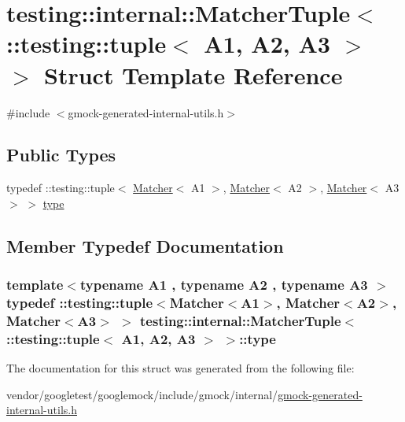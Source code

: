 \hypertarget{structtesting_1_1internal_1_1MatcherTuple_3_01_1_1testing_1_1tuple_3_01A1_00_01A2_00_01A3_01_4_01_4}{}\section{testing\+:\+:internal\+:\+:Matcher\+Tuple$<$ \+:\+:testing\+:\+:tuple$<$ A1, A2, A3 $>$ $>$ Struct Template Reference}
\label{structtesting_1_1internal_1_1MatcherTuple_3_01_1_1testing_1_1tuple_3_01A1_00_01A2_00_01A3_01_4_01_4}


{\ttfamily \#include $<$gmock-\/generated-\/internal-\/utils.\+h$>$}

\subsection*{Public Types}
\begin{DoxyCompactItemize}
\item 
typedef \+::testing\+::tuple$<$ \hyperlink{classtesting_1_1Matcher}{Matcher}$<$ A1 $>$, \hyperlink{classtesting_1_1Matcher}{Matcher}$<$ A2 $>$, \hyperlink{classtesting_1_1Matcher}{Matcher}$<$ A3 $>$ $>$ \hyperlink{structtesting_1_1internal_1_1MatcherTuple_3_01_1_1testing_1_1tuple_3_01A1_00_01A2_00_01A3_01_4_01_4_a14ce558da46f2d3829b2dfacdab2c980}{type}
\end{DoxyCompactItemize}


\subsection{Member Typedef Documentation}
\subsubsection[{\texorpdfstring{type}{type}}]{\setlength{\rightskip}{0pt plus 5cm}template$<$typename A1 , typename A2 , typename A3 $>$ typedef \+::testing\+::tuple$<${\bf Matcher}$<$A1$>$, {\bf Matcher}$<$A2$>$, {\bf Matcher}$<$A3$>$ $>$ {\bf testing\+::internal\+::\+Matcher\+Tuple}$<$ \+::testing\+::tuple$<$ A1, A2, A3 $>$ $>$\+::{\bf type}}\hypertarget{structtesting_1_1internal_1_1MatcherTuple_3_01_1_1testing_1_1tuple_3_01A1_00_01A2_00_01A3_01_4_01_4_a14ce558da46f2d3829b2dfacdab2c980}{}\label{structtesting_1_1internal_1_1MatcherTuple_3_01_1_1testing_1_1tuple_3_01A1_00_01A2_00_01A3_01_4_01_4_a14ce558da46f2d3829b2dfacdab2c980}


The documentation for this struct was generated from the following file\+:\begin{DoxyCompactItemize}
\item 
vendor/googletest/googlemock/include/gmock/internal/\hyperlink{gmock-generated-internal-utils_8h}{gmock-\/generated-\/internal-\/utils.\+h}\end{DoxyCompactItemize}
